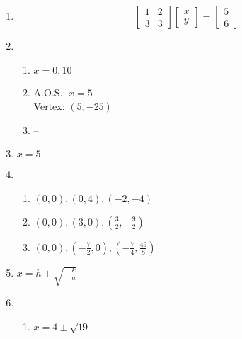 \documentclass{article}
\begin{document}
\begin{enumerate}
\item 
	\begin{equation*}
	\begin{bmatrix}
	1 & 2 \\
	3 & 3
	\end{bmatrix}
	\begin{bmatrix}
	x \\
	y
	\end{bmatrix} =
	\begin{bmatrix}
	5 \\
	6
	\end{bmatrix}
	\end{equation*}
	
\item

	\begin{enumerate}
	
	\item $x = 0, 10$
	
	\item A.O.S.:  $x = 5$ \\
		Vertex: $(5, -25)$
		
	\item --
	
	\end{enumerate}
	
\item $x = 5$

\item

	\begin{enumerate}
	
	\item $(0, 0), (0, 4), (-2, -4)$
	
	\item $(0,0), (3,0), (\frac{3}{2}, -\frac{9}{2})$
	
	\item $(0,0), (-\frac{7}{2}, 0), (-\frac{7}{4}, \frac{49}{8})$
	
	\end{enumerate}
	
\item $x = h \pm \sqrt{-\frac{k}{a}}$

\item

	\begin{enumerate}
	
	\item $x = 4 \pm \sqrt{19}$
	
	\end{enumerate}
	

\end{enumerate}
\end{document}
